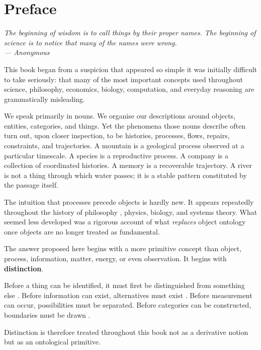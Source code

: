 \documentclass[12pt,twoside,openright]{book}
\newenvironment{epigraph}[2]{%
  \vspace{1em}\begin{flushright}
  \begin{minipage}{0.72\textwidth}
  \itshape\small #1\\[0.4em]
  \upshape\footnotesize\sffamily\color{DistGray}--- #2
  \end{minipage}\end{flushright}\vspace{1.5em}}{}
\begin{document}
\chapter*{Preface}

\begin{epigraph}{The beginning of wisdom is to call things by
  their proper names. The beginning of science is to notice
  that many of the names were wrong.}{Anonymous}
\end{epigraph}

This book began from a suspicion that appeared so simple
it was initially difficult to take seriously: that many
of the most important concepts used throughout science,
philosophy, economics, biology, computation, and everyday
reasoning are grammatically misleading.

We speak primarily in nouns. We organise our descriptions
around objects, entities, categories, and things. Yet the
phenomena those nouns describe often turn out, upon closer
inspection, to be histories, processes, flows, repairs,
constraints, and trajectories. A mountain is a geological
process observed at a particular timescale. A species is a
reproductive process. A company is a collection of
coordinated histories. A memory is a recoverable trajectory.
A river is not a thing through which water passes; it is a
stable pattern constituted by the passage itself.

The intuition that processes precede objects is hardly new.
It appears repeatedly throughout the history of philosophy
\parencite{whitehead1929,bergson1896,rescher1996},
physics, biology, and systems theory. What seemed less
developed was a rigorous account of what \emph{replaces}
object ontology once objects are no longer treated as
fundamental.

The answer proposed here begins with a more primitive
concept than object, process, information, matter, energy,
or even observation. It begins with \textbf{distinction}.

Before a thing can be identified, it must first be
distinguished from something else \parencite{spencer-brown1969}.
Before information can exist, alternatives must exist
\parencite{shannon1948}. Before measurement can occur,
possibilities must be separated. Before categories can
be constructed, boundaries must be drawn
\parencite{bateson1972}.

Distinction is therefore treated throughout this book not
as a derivative notion but as an ontological primitive.
\end{document}
